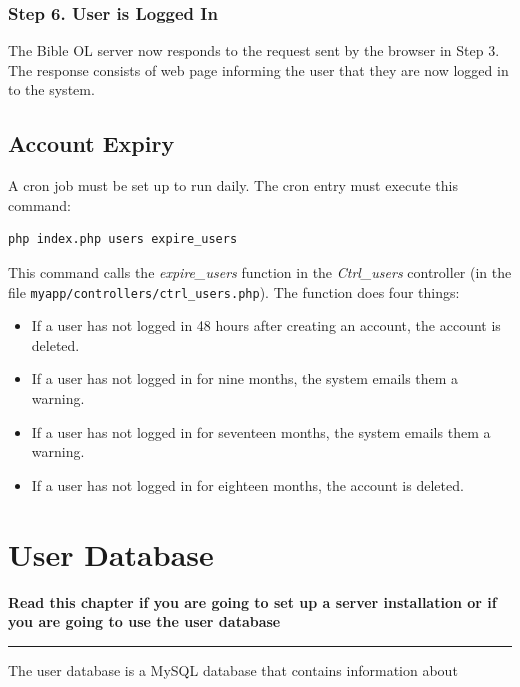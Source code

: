 \documentclass[11pt,oneside,a4paper]{memoir}
\begin{document}
\subsection*{Step 6. User is Logged In}

The Bible OL server now responds to the request sent by the browser in Step 3. The response consists
of web page informing the user that they are now logged in to the system.

\section{Account Expiry}

A cron job must be set up to run daily. The cron entry must execute this command:

\begin{lstlisting}[language=bash,basicstyle={\ttfamily}]
php index.php users expire_users
\end{lstlisting}

This command calls the \emph{expire\_users} function in the \emph{Ctrl\_users} controller (in the
file \texttt{myapp/\allowbreak{}controllers/\allowbreak{}ctrl\_users.php}). The function does four
things:

\begin{itemize}
\item If a user has not logged in 48 hours after creating an account, the account is deleted.
\item If a user has not logged in for nine months, the system emails them a warning.
\item If a user has not logged in for seventeen months, the system emails them a warning.
\item If a user has not logged in for eighteen months, the account is deleted.
\end{itemize}



\chapter{User Database}\label{chap-user-database}

\textbf{Read this chapter if you are going to set up a server installation or if you are going to
  use the user database}
\plainbreak{3}

The user database is a MySQL database that contains information about
\end{document}
